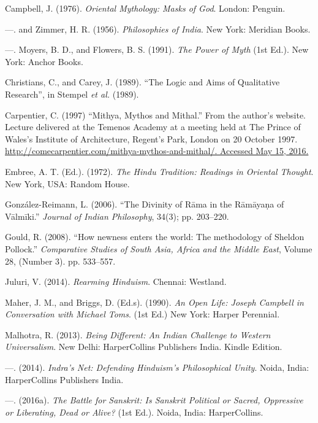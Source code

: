 \begin{thebibliography}{99}
 Campbell, J. (1976). \textit{Oriental Mythology: Masks of God}. London: Penguin.

  —. and Zimmer, H. R. (1956). \textit{Philosophies of India}. New York: Meridian Books.

  —. Moyers, B. D., and Flowers, B. S. (1991). \textit{The Power of Myth} (1st Ed.). New York: Anchor Books.

  Christians, C., and Carey, J. (1989). “The Logic and Aims of Qualitative Research”, in Stempel \textit{et al.} (1989).

  Carpentier, C. (1997) “Mithya, Mythos and Mithal.” From the author’s website. Lecture delivered at the Temenos Academy at a meeting held at The Prince of Wales's Institute of Architecture, Regent's Park, London on 20 October 1997. \url{http://comecarpentier.com/mithya-mythos-and-mithal/. Accessed May 15, 2016.}

  Embree, A. T. (Ed.). (1972). \textit{The Hindu Tradition: Readings in Oriental Thought}. New York, USA: Random House.

  González-Reimann, L. (2006). “The Divinity of Rāma in the Rāmāyaṇa of Vālmīki.” \textit{Journal of Indian Philosophy}, 34(3); pp. 203--220.

  Gould, R. (2008). “How newness enters the world: The methodology of Sheldon Pollock.” \textit{Comparative Studies of South Asia, Africa and the Middle East}, Volume 28, (Number 3). pp. 533--557.

  Juluri, V. (2014). \textit{Rearming Hinduism}. Chennai: Westland.

  Maher, J. M., and Briggs, D. (Ed.s). (1990). \textit{An Open Life: Joseph Campbell in Conversation with Michael Toms}. (1st Ed.) New York: Harper Perennial.

  Malhotra, R. (2013). \textit{Being Different: An Indian Challenge to Western Universalism}. New Delhi: HarperCollins Publishers India. Kindle Edition.

  —. (2014). \textit{Indra’s Net: Defending Hinduism’s Philosophical Unity}. Noida, India: HarperCollins Publishers India.

  —. (2016a). \textit{The Battle for Sanskrit: Is Sanskrit Political or Sacred, Oppressive or Liberating, Dead or Alive?} (1st Ed.). Noida, India: HarperCollins.


\end{thebibliography}
